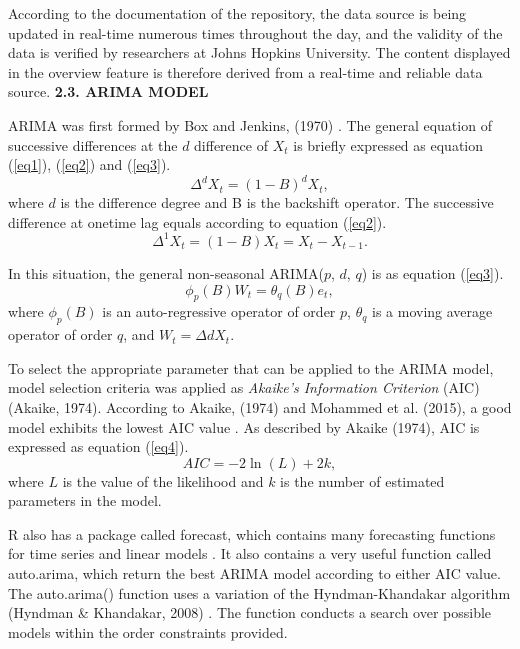 \documentclass[12pt, a4paper,oneside]{book}
\theoremstyle{definition}
\begin{document}
According to the documentation of the repository, the data source is being updated in real-time numerous times throughout the day, and the validity of the data is verified by researchers at Johns Hopkins University. The content displayed in the overview feature is therefore derived from a real-time and reliable data source.
\vskip 0.5cm
\noindent 
{\bf 2.3. ARIMA MODEL}

ARIMA was first formed by Box and Jenkins, (1970) \cite{6, 7}. The general equation of successive differences at the $d$  difference of $X_t$ is briefly expressed as equation (\ref{eq1}), (\ref{eq2}) and (\ref{eq3}).
\begin{equation}
	\Delta^{d}X_t = (1-B)^{d}X_t,
	\label{eq1}
\end{equation}
where $d$ is the difference degree and B is the backshift operator. The successive difference at onetime lag equals according to equation (\ref{eq2}).
\begin{equation}
\Delta^{1}X_t = (1-B)X_t = X_t - X_{t-1}.
\label{eq2}
\end{equation}

In this situation, the general non-seasonal ARIMA($p$, $d$, $q$) is as equation (\ref{eq3}).
\begin{equation}
\phi_p(B)W_t = \theta_q(B)e_t,
\label{eq3}
\end{equation}
where $\phi_p(B)$ is an auto-regressive operator of order $p$, $\theta_q$  is a moving average operator of order $q$, and $W_t = \Delta dX_t$.

To select the appropriate parameter that can be applied to the ARIMA model, model selection criteria was applied as \textit{Akaike's Information Criterion} (AIC) (Akaike, 1974). According to Akaike, (1974) and Mohammed et al. (2015), a good model exhibits the lowest AIC value \cite{6}. As described by Akaike (1974), AIC is expressed as equation (\ref{eq4}).
\begin{equation}
AIC = -2\ln(L)+ 2k,
\label{eq4}
\end{equation}
where $L$ is the value of the likelihood and $k$ is the number of estimated parameters in the model. 

R also has a package called forecast, which contains many forecasting functions for time series and linear models \cite{7, 8}. It also contains a very useful function called auto.arima, which return the best ARIMA model according to either AIC value. The auto.arima() function uses a variation of the Hyndman-Khandakar algorithm (Hyndman \& Khandakar, 2008) \cite{8}. The function conducts a search over possible models within the order constraints provided.
\end{document}

